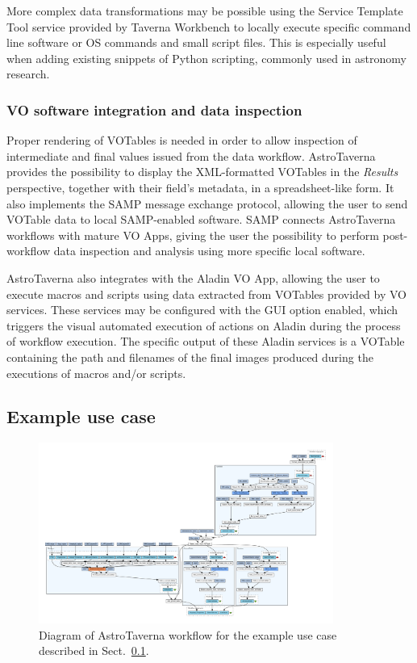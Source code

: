 \documentclass{aa}
\begin{document}
More complex data transformations may be possible using the Service Template Tool service provided by Taverna Workbench to locally execute specific command line software or OS commands and small script files. This is especially useful when adding existing snippets of Python scripting, commonly used in astronomy research.  

\subsubsection{VO software integration and data inspection}
\label{VOApps}

Proper rendering of VOTables is needed in order to allow inspection of intermediate and final values issued from the data workflow. AstroTaverna provides the possibility to display the XML-formatted VOTables in the \emph{Results} perspective, together with their field’s metadata, in a spreadsheet-like form. It also implements the SAMP message exchange protocol, allowing the user to send VOTable data to local SAMP-enabled software. SAMP connects AstroTaverna workflows with mature VO Apps, giving the user the possibility to perform post-workflow data inspection and analysis using more specific local software.

AstroTaverna also integrates with the Aladin VO App, allowing the user to execute macros and scripts using data extracted from VOTables provided by VO services. These services may be configured with the GUI option enabled, which triggers the visual automated execution of actions on Aladin during the process of workflow execution. The specific output of these Aladin services is a VOTable containing the path and filenames of the final images produced during the executions of macros and/or scripts.  

\subsection{Example use case}
\label{Usecase}

\begin{figure}[tb]
\centering 
\includegraphics[width=0.86\textwidth]{WfDiagram}
\caption{Diagram of AstroTaverna workflow for the example use case described in Sect.~\ref{Usecase}.}
\label{fig:WfDiagram}
\end{figure}
\end{document}
